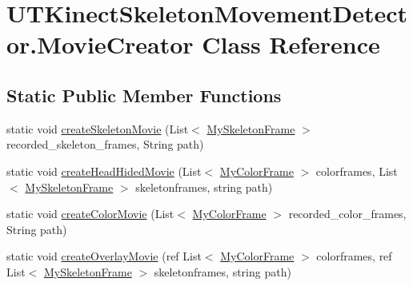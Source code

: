 \hypertarget{class_u_t_kinect_skeleton_movement_detector_1_1_movie_creator}{\section{U\-T\-Kinect\-Skeleton\-Movement\-Detector.\-Movie\-Creator Class Reference}
\label{class_u_t_kinect_skeleton_movement_detector_1_1_movie_creator}
}
\subsection*{Static Public Member Functions}
\begin{DoxyCompactItemize}
\item 
static void \hyperlink{class_u_t_kinect_skeleton_movement_detector_1_1_movie_creator_aafc8c8982e0970d2821bf25b0ce8e565}{create\-Skeleton\-Movie} (List$<$ \hyperlink{class_u_t_kinect_skeleton_movement_detector_1_1_my_skeleton_frame}{My\-Skeleton\-Frame} $>$ recorded\-\_\-skeleton\-\_\-frames, String path)
\item 
static void \hyperlink{class_u_t_kinect_skeleton_movement_detector_1_1_movie_creator_a36477a3256e44e8b5d2ccf5f327ecfc5}{create\-Head\-Hided\-Movie} (List$<$ \hyperlink{class_u_t_kinect_skeleton_movement_detector_1_1_my_color_frame}{My\-Color\-Frame} $>$ colorframes, List$<$ \hyperlink{class_u_t_kinect_skeleton_movement_detector_1_1_my_skeleton_frame}{My\-Skeleton\-Frame} $>$ skeletonframes, string path)
\item 
static void \hyperlink{class_u_t_kinect_skeleton_movement_detector_1_1_movie_creator_a7fd66211d625f35e484a48f97c90f99d}{create\-Color\-Movie} (List$<$ \hyperlink{class_u_t_kinect_skeleton_movement_detector_1_1_my_color_frame}{My\-Color\-Frame} $>$ recorded\-\_\-color\-\_\-frames, String path)
\item 
static void \hyperlink{class_u_t_kinect_skeleton_movement_detector_1_1_movie_creator_a8d05c98c086701159a6741eba4b04b80}{create\-Overlay\-Movie} (ref List$<$ \hyperlink{class_u_t_kinect_skeleton_movement_detector_1_1_my_color_frame}{My\-Color\-Frame} $>$ colorframes, ref List$<$ \hyperlink{class_u_t_kinect_skeleton_movement_detector_1_1_my_skeleton_frame}{My\-Skeleton\-Frame} $>$ skeletonframes, string path)
\end{DoxyCompactItemize}


